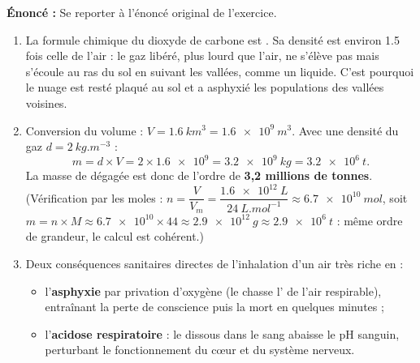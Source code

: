 \documentclass[11pt]{article}
\begin{document}
\begin{corrige}
\textbf{Énoncé :} Se reporter à l'énoncé original de l'exercice.
\tcblower
\begin{enumerate}
\item La formule chimique du dioxyde de carbone est . Sa densité est environ \num{1,5} fois celle de l'air : le gaz libéré, plus lourd que l'air, ne s'élève pas mais s'écoule au ras du sol en suivant les vallées, comme un liquide. C'est pourquoi le nuage est resté plaqué au sol et a asphyxié les populations des vallées voisines.
\item Conversion du volume : $V = \SI{1,6}{km^3} = \num{1,6e9}~\si{m^3}$. Avec une densité du gaz $d = \SI{2}{kg.m^{-3}}$ :
\[ m = d \times V = 2 \times \num{1,6e9} = \num{3,2e9}~\si{kg} = \num{3,2e6}~\si{t}. \]
La masse de  dégagée est donc de l'ordre de \textbf{3,2 millions de tonnes}. (Vérification par les moles : $n = \dfrac{V}{V_m} = \dfrac{\num{1,6e12}~\si{L}}{24~\si{L.mol^{-1}}} \approx \num{6,7e10}~\si{mol}$, soit $m = n \times M \approx \num{6,7e10} \times 44 \approx \num{2,9e12}~\si{g} \approx \num{2,9e6}~\si{t}$ : même ordre de grandeur, le calcul est cohérent.)
\item Deux conséquences sanitaires directes de l'inhalation d'un air très riche en  :
\begin{itemize}
\item l'\textbf{asphyxie} par privation d'oxygène (le  chasse l' de l'air respirable), entraînant la perte de conscience puis la mort en quelques minutes ;
\item l'\textbf{acidose respiratoire} : le  dissous dans le sang abaisse le pH sanguin, perturbant le fonctionnement du cœur et du système nerveux.
\end{itemize}
\end{enumerate}
\end{corrige}
\end{document}
